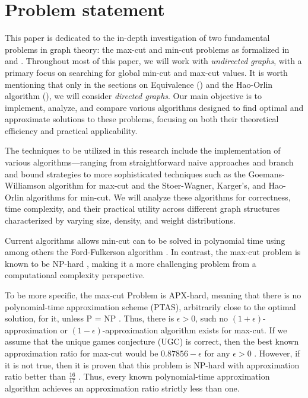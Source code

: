 \section{Problem statement}

This paper is dedicated to the in-depth investigation of two fundamental problems in graph theory: the max-cut and min-cut problems as formalized in  and . Throughout most of this paper, we will work with \emph{undirected graphs}, with a primary focus on searching for global min-cut and max-cut values. It is worth mentioning that only in the sections on Equivalence () and the Hao-Orlin algorithm (), we will consider \emph{directed graphs}. Our main objective is to implement, analyze, and compare various algorithms designed to find optimal and approximate solutions to these problems, focusing on both their theoretical efficiency and practical applicability.

The techniques to be utilized in this research include the implementation of various algorithms—ranging from straightforward naive approaches and branch and bound strategies to more sophisticated techniques such as the Goemans-Williamson algorithm for max-cut and the Stoer-Wagner, Karger's, and Hao-Orlin algorithms for min-cut. We will analyze these algorithms for correctness, time complexity, and their practical utility across different graph structures characterized by varying size, density, and weight distributions.

Current algorithms allows min-cut can to be solved in polynomial time using among others the Ford-Fulkerson algorithm \cite{ford1956maximal}. In contrast, the max-cut problem is known to be NP-hard \cite{karp1972reducibility}, making it a more challenging problem from a computational complexity perspective.

To be more specific, the max-cut Problem is APX-hard, meaning that there is no polynomial-time approximation scheme (PTAS), arbitrarily close to the optimal solution, for it, unless P = NP \cite{papadimitriou1991optimization}. Thus, there is \( \epsilon > 0 \), such no \((1 + \epsilon)\)-approximation or \((1 - \epsilon)\)-approximation algorithm exists for max-cut. If we assume that the unique games conjecture (UGC) is correct, then the best known approximation ratio for max-cut would be \( 0.87856 - \epsilon \) for any \( \epsilon > 0 \) \cite{khot2007optimal}. However, if it is not true, then it is proven that this problem is NP-hard with approximation ratio better than \( \frac{16}{17} \) \cite{hastad2001optimal}. Thus, every known polynomial-time approximation algorithm achieves an approximation ratio strictly less than one.

